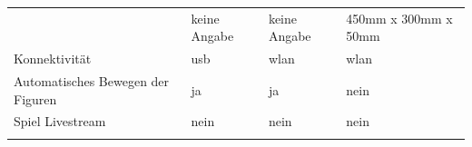 \begin{longtable}[]{@{}llll@{}}
\begin{minipage}[t]{0.19\columnwidth}
\end{minipage} & \begin{minipage}[t]{0.25\columnwidth}\raggedright
keine Angabe\strut
\end{minipage} & \begin{minipage}[t]{0.26\columnwidth}\raggedright
keine Angabe\strut
\end{minipage} & \begin{minipage}[t]{0.19\columnwidth}\raggedright
450mm x 300mm x 50mm\strut
\end{minipage}\tabularnewline
\begin{minipage}[t]{0.19\columnwidth}\raggedright
Konnektivität\strut
\end{minipage} & \begin{minipage}[t]{0.25\columnwidth}\raggedright
\gls{usb}\strut
\end{minipage} & \begin{minipage}[t]{0.26\columnwidth}\raggedright
\gls{wlan}\strut
\end{minipage} & \begin{minipage}[t]{0.19\columnwidth}\raggedright
\gls{wlan}\strut
\end{minipage}\tabularnewline
\begin{minipage}[t]{0.19\columnwidth}\raggedright
Automatisches Bewegen der Figuren\strut
\end{minipage} & \begin{minipage}[t]{0.25\columnwidth}\raggedright
ja\strut
\end{minipage} & \begin{minipage}[t]{0.26\columnwidth}\raggedright
ja\strut
\end{minipage} & \begin{minipage}[t]{0.19\columnwidth}\raggedright
nein\strut
\end{minipage}\tabularnewline
\begin{minipage}[t]{0.19\columnwidth}\raggedright
Spiel Livestream\strut
\end{minipage} & \begin{minipage}[t]{0.25\columnwidth}\raggedright
nein\strut
\end{minipage} & \begin{minipage}[t]{0.26\columnwidth}\raggedright
nein\strut
\end{minipage} & \begin{minipage}[t]{0.19\columnwidth}\raggedright
nein\strut
\end{minipage}\tabularnewline
\begin{minipage}[t]{0.19\columnwidth}\raggedright

\end{minipage}
\end{longtable}
